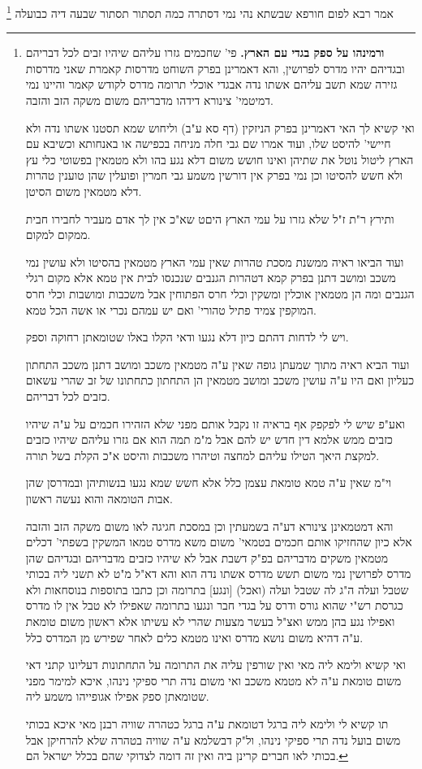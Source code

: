 \documentclass[12pt, openany]{book}
\newcommand{\footnotecomment}[1]{\footnote{#1}}
\newcommand{\commenta}[1]{\footnotecomment{#1}}
\begin{document}
{אמר רבא  לפום חורפא שבשתא נהי נמי דסתרה כמה תסתור  תסתור שבעה דיה כבועלה 
\commenta{\textbf{ורמינהו על ספק בגדי עם הארץ.}  פי' שחכמים גזרו עליהם שיהיו זבים לכל דבריהם ובגדיהם יהיו מדרס לפרושין, והא דאמרינן בפרק השוחט מדרסות קאמרת שאני מדרסות גזירה שמא תשב עליהם אשתו נדה אבגדי אוכלי תרומה מדרס לקודש קאמר והיינו נמי דמיטמי' צינורא דידהו מדבריהם משום משקה הזב והזבה.\par ואי קשיא לך האי דאמרינן בפרק הניזקין (דף סא ע"ב) וליחוש שמא תסטנו אשתו נדה ולא חיישי' להיסט שלו, ועוד אמרו שם גבי חלה מניחה בכפישה או באנחותא וכשיבא עם הארץ ליטול נוטל את שתיהן ואינו חושש משום דלא נגע בהו ולא מטמאין בפשוטי כלי עץ ולא חשש להסיטו וכן נמי בפרק אין דורשין משמע גבי חמרין ופועלין שהן טוענין טהרות דלא מטמאין משום הסיטן.\par ותירץ ר"ת ז"ל שלא גזרו על עמי הארץ היםט שא"כ אין לך אדם מעביר לחבירו חבית ממקום למקום.\par ועוד הביאו ראיה ממשנת מסכת טהרות שאין עמי הארץ מטמאין בהסיטו ולא עושין נמי משכב ומושב דתנן בפרק קמא דטהרות הגנבים שנכנסו לבית אין טמא אלא מקום רגלי הגנבים ומה הן מטמאין אוכלין ומשקין וכלי חרס הפתוחין אבל משכבות ומושבות וכלי חרס המוקפין צמיד פתיל טהורי' ואם יש עמהם נכרי או אשה הכל טמא.\par  ויש לי לדחות דהתם כיון דלא נגעו ודאי הקלו באלו שטומאתן רחוקה וספק.\par  ועוד הביא ראיה מתוך שמעתן גופה שאין ע"ה מטמאין משכב ומושב דתנן משכב התחתון כעליון ואם היו ע"ה עושין משכב ומושב מטמאין הן התחתון כתחתונו של זב שהרי עשאום כזבים לכל דבריהם.\par  ואע"פ שיש לי לפקפק אף בראיה זו נקבל אותם מפני שלא הזהירו חכמים על ע"ה שיהיו כזבים ממש אלמא דין חדש יש להם אבל מ"מ תמה הוא אם גזרו עליהם שיהיו כזבים למקצת היאך הטילו עליהם למחצה וטיהרו משכבות והיסט א"כ הקלת בשל תורה.\par וי"מ שאין ע"ה טמא טומאת עצמן כלל אלא חשש שמא נגעו בנשותיהן ובמדרסן שהן אבות הטומאה והוא נעשה ראשון.\par  והא דמטמאינן צינורא דע"ה בשמעתין וכן במסכת חגיגה לאו משום משקה הזב והזבה אלא כיון שהחזיקו אותם חכמים בטמאי' משום משא מדרס טמאו המשקין בשפתי' דכלים מטמאין משקים מדבריהם בפ"ק דשבת אבל לא שיהיו כזבים מדבריהם ובגדיהם שהן מדרס לפרושין נמי משום תשש מדרס אשתו נדה הוא והא דא"ל מ"ט לא תשני ליה בכותי שטבל ועלה ה"ג לה שטבל ועלה (ואכל) [ונגע] בתרומה וכן כתבו בתוספות בנוסחאות ולא כגרסת רש"י שהוא גורס ודרס על בגדי חבר ונגעו בתרומה שאפילו לא טבל אין לו מדרס ואפילו נגע בהן ממש ואצ"ל בעשר מצעות שהרי לא עשיתו אלא ראשון משום טומאת ע"ה דהיא משום נושא מדרס ואינו מטמא כלים לאחר שפירש מן המדרס כלל.\par  ואי קשיא ולימא ליה מאי ואין שורפין עליה את התרומה על התחתונות דעליונו קתני דאי משום טומאת ע"ה לא מטמא משכב ואי משום נדה תרי ספיקי נינהו, איכא למימר מפני שטומאתן ספק אפילו אגופייהו משמע ליה.\par תו קשיא לי ולימא ליה ברגל דטומאת ע"ה ברגל כטהרה שוויה רבנן מאי איכא בכותי משום בועל נדה תרי ספיקי נינהו, ול"ק דבשלמא ע"ה שוויה בטהרה שלא להרחיקן אבל בכותי לאו חברים קרינן ביה ואין זה דומה לצדוקי שהם בכלל ישראל הם. }

}
\end{document}
